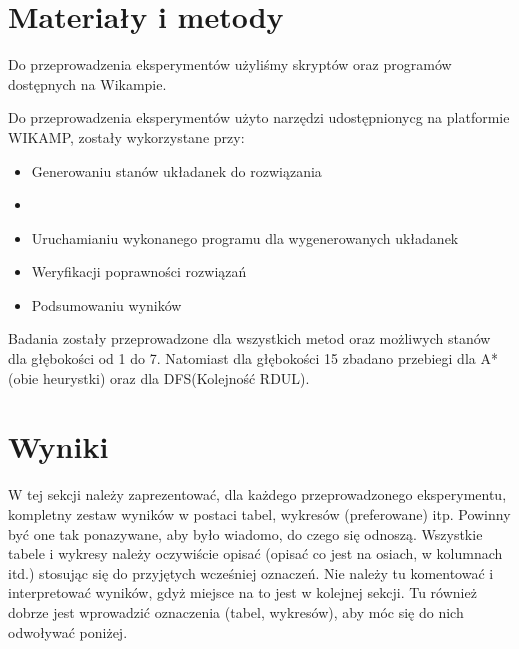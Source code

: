 \documentclass{classrep}
\begin{document}
    \section{Materiały i metody}
    {\color{blue}
        Do przeprowadzenia eksperymentów użyliśmy skryptów oraz programów dostępnych na Wikampie.

    Do przeprowadzenia eksperymentów użyto narzędzi udostępnionycg na platformie WIKAMP,
    zostały wykorzystane przy:
       \begin{itemize}
            \item Generowaniu stanów układanek do rozwiązania
            \item \item Uruchamianiu wykonanego programu dla wygenerowanych układanek
          \item Weryfikacji poprawności rozwiązań
           \item Podsumowaniu wyników
     \end{itemize}
    Badania zostały przeprowadzone dla wszystkich metod oraz możliwych stanów dla
    głębokości od 1 do 7. Natomiast dla głębokości 15 zbadano przebiegi dla A*(obie heurystki)
    oraz dla DFS(Kolejność RDUL).
    }

    \section{Wyniki}
    {\color{blue}
    W tej sekcji należy zaprezentować, dla każdego przeprowadzonego eksperymentu,
        kompletny zestaw wyników w postaci tabel, wykresów (preferowane) itp. Powinny
    być one tak ponazywane, aby było wiadomo, do czego się odnoszą. Wszystkie
    tabele i wykresy należy oczywiście opisać (opisać co jest na osiach, w
    kolumnach itd.) stosując się do przyjętych wcześniej oznaczeń. Nie należy tu
    komentować i interpretować wyników, gdyż miejsce na to jest w kolejnej sekcji.
    Tu również dobrze jest wprowadzić oznaczenia (tabel, wykresów), aby móc się do
    nich odwoływać poniżej.}
\end{document}
